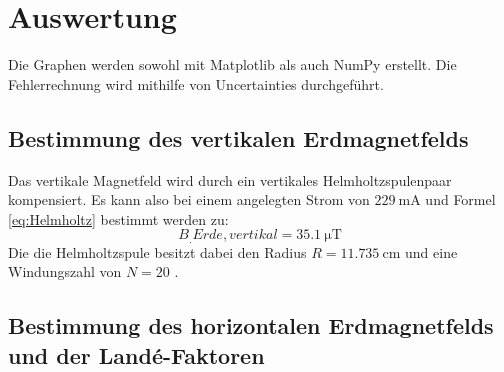 \section{Auswertung}
\label{sec:Auswertung}

Die Graphen werden sowohl mit Matplotlib \cite{matplotlib} als auch NumPy \cite{numpy} erstellt. Die Fehlerrechnung wird mithilfe von Uncertainties \cite{uncertainties} durchgeführt.

\subsection{Bestimmung des vertikalen Erdmagnetfelds}

Das vertikale Magnetfeld wird durch ein vertikales Helmholtzspulenpaar kompensiert. Es kann also bei einem angelegten Strom von $\SI{229}{\milli\ampere}$ und Formel \ref{eq:Helmholtz} bestimmt werden zu:
\[
B_.{Erde,vertikal} = \SI{35.1}{\micro\tesla}
\]
Die die Helmholtzspule besitzt dabei den Radius $R=\SI{11,735}{\centi\metre}$ und eine Windungszahl von $N=20$ \cite{V21}.

\subsection{Bestimmung des horizontalen Erdmagnetfelds und der Landé-Faktoren}

